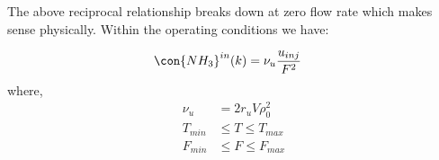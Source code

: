 The above reciprocal relationship breaks down at zero flow rate which makes sense physically. Within the operating conditions we have:

%
%
\begin{align}
    \con{NH_3}^{in}(k) &= \nu_u \frac{u_{inj}}{F^2}    \label{eqn::urea_inj}
\end{align}
where,
\begin{align*}
    \nu_u &= 2r_u V \rho^2_0\\
    T_{min} &\leq T \leq T_{max}\\
    F_{min} &\leq F \leq F_{max}
\end{align*}
